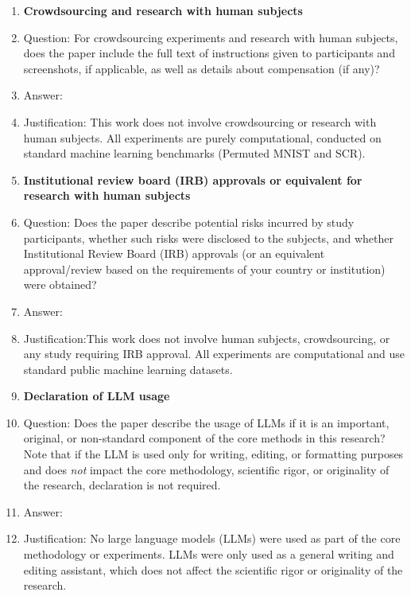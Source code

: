\begin{enumerate}
\item {\bf Crowdsourcing and research with human subjects}
    \item[] Question: For crowdsourcing experiments and research with human subjects, does the paper include the full text of instructions given to participants and screenshots, if applicable, as well as details about compensation (if any)? 
    \item[] Answer: \answerNA{} %
    \item[] Justification:  This work does not involve crowdsourcing or research with human subjects. All experiments are purely computational, conducted on standard machine learning benchmarks (Permuted MNIST and SCR).  

\item {\bf Institutional review board (IRB) approvals or equivalent for research with human subjects}
    \item[] Question: Does the paper describe potential risks incurred by study participants, whether such risks were disclosed to the subjects, and whether Institutional Review Board (IRB) approvals (or an equivalent approval/review based on the requirements of your country or institution) were obtained?
    \item[] Answer: \answerNA{}   %
    \item[] Justification:This work does not involve human subjects, crowdsourcing, or any study requiring IRB approval. All experiments are computational and use standard public machine learning datasets.  

\item {\bf Declaration of LLM usage}
    \item[] Question: Does the paper describe the usage of LLMs if it is an important, original, or non-standard component of the core methods in this research? Note that if the LLM is used only for writing, editing, or formatting purposes and does \emph{not} impact the core methodology, scientific rigor, or originality of the research, declaration is not required.
    \item[] Answer: \answerNA{}   %
    \item[] Justification: No large language models (LLMs) were used as part of the core methodology or experiments. LLMs were only used as a general writing and editing assistant, which does not affect the scientific rigor or originality of the research.

\end{enumerate}